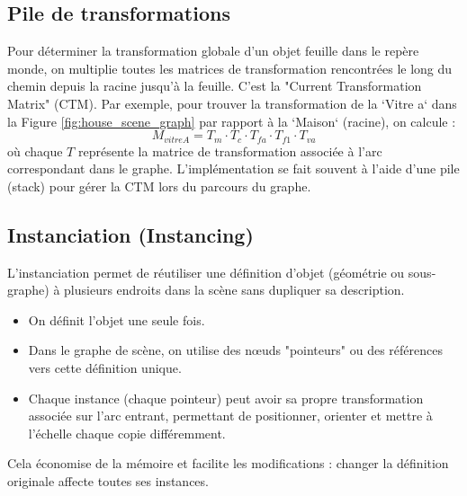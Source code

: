 \documentclass{article}
\begin{document}
\subsection{Pile de transformations}
Pour déterminer la transformation globale d'un objet feuille dans le repère monde, on multiplie toutes les matrices de transformation rencontrées le long du chemin depuis la racine jusqu'à la feuille. C'est la "Current Transformation Matrix" (CTM).
Par exemple, pour trouver la transformation de la `Vitre a` dans la Figure \ref{fig:house_scene_graph} par rapport à la `Maison` (racine), on calcule :
\[ M_{vitreA} = T_m \cdot T_c \cdot T_{fa} \cdot T_{f1} \cdot T_{va} \]
où chaque $T$ représente la matrice de transformation associée à l'arc correspondant dans le graphe. L'implémentation se fait souvent à l'aide d'une pile (stack) pour gérer la CTM lors du parcours du graphe.

\subsection{Instanciation (Instancing)}
L'instanciation permet de réutiliser une définition d'objet (géométrie ou sous-graphe) à plusieurs endroits dans la scène sans dupliquer sa description.
\begin{itemize}
    \item On définit l'objet une seule fois.
    \item Dans le graphe de scène, on utilise des nœuds "pointeurs" ou des références vers cette définition unique.
    \item Chaque instance (chaque pointeur) peut avoir sa propre transformation associée sur l'arc entrant, permettant de positionner, orienter et mettre à l'échelle chaque copie différemment.
\end{itemize}
Cela économise de la mémoire et facilite les modifications : changer la définition originale affecte toutes ses instances.
\end{document}
